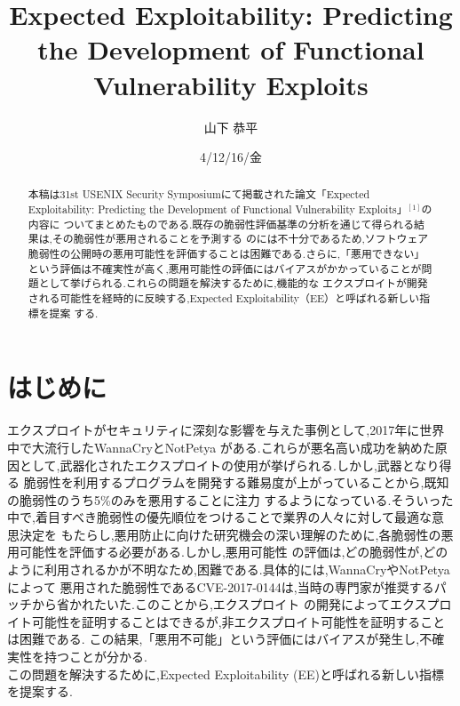 \documentclass[submit,techreq,noauthor]{eco}	%
\begin{document}
\date   {4/12/16/金}				%
\title  {Expected Exploitability: Predicting the Development of Functional Vulnerability Exploits}	%
\author {山下 恭平}				%

\begin{abstract}
本稿は31st USENIX Security Symposiumにて掲載された論文「Expected Exploitability: Predicting 
the Development of Functional Vulnerability Exploits」\begin{math}^{[1]}\end{math}の内容に
ついてまとめたものである.既存の脆弱性評価基準の分析を通じて得られる結果は,その脆弱性が悪用されることを予測する
のには不十分であるため,ソフトウェア脆弱性の公開時の悪用可能性を評価することは困難である.さらに,「悪用できない」
という評価は不確実性が高く,悪用可能性の評価にはバイアスがかかっていることが問題として挙げられる.これらの問題を解決するために,機能的な
エクスプロイトが開発される可能性を経時的に反映する,Expected Exploitability（EE）と呼ばれる新しい指標を提案
する.

\end{abstract}
\maketitle

\section{はじめに}
エクスプロイトがセキュリティに深刻な影響を与えた事例として,2017年に世界中で大流行したWannaCryとNotPetya
がある.これらが悪名高い成功を納めた原因として,武器化されたエクスプロイトの使用が挙げられる.しかし,武器となり得る
脆弱性を利用するプログラムを開発する難易度が上がっていることから,既知の脆弱性のうち5\%のみを悪用することに注力
するようになっている.そういった中で,着目すべき脆弱性の優先順位をつけることで業界の人々に対して最適な意思決定を
もたらし,悪用防止に向けた研究機会の深い理解のために,各脆弱性の悪用可能性を評価する必要がある.しかし,悪用可能性
の評価は,どの脆弱性が,どのように利用されるかが不明なため,困難である.具体的には,WannaCryやNotPetyaによって
悪用された脆弱性であるCVE-2017-0144は,当時の専門家が推奨するパッチから省かれたいた.このことから,エクスプロイト
の開発によってエクスプロイト可能性を証明することはできるが,非エクスプロイト可能性を証明することは困難である.
この結果,「悪用不可能」という評価にはバイアスが発生し,不確実性を持つことが分かる.\\
この問題を解決するために,Expected Exploitability (EE)と呼ばれる新しい指標を提案する.
\end{document}

